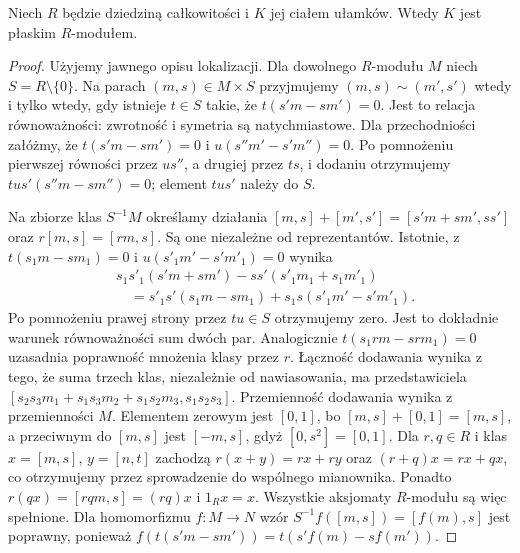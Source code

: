 \begin{twierdzenie}
\label{aa:tw:frac-flat}
Niech $R$ będzie dziedziną całkowitości i $K$
jej ciałem ułamków. Wtedy $K$ jest płaskim
$R$-modułem.
\end{twierdzenie}
\begin{proof}
Użyjemy jawnego opisu lokalizacji. Dla dowolnego
$R$-modułu $M$ niech $S=R\setminus\{0\}$.
Na parach $(m,s)\in M\times S$ przyjmujemy
$(m,s)\sim(m',s')$ wtedy i tylko wtedy, gdy
istnieje $t\in S$ takie, że $t(s'm-sm')=0$.
Jest to relacja równoważności: zwrotność i symetria
są natychmiastowe. Dla przechodniości załóżmy, że
$t(s'm-sm')=0$ i $u(s''m'-s'm'')=0$.
Po pomnożeniu pierwszej równości przez $us''$,
a drugiej przez $ts$, i dodaniu otrzymujemy
$tu s'(s''m-sm'')=0$; element $tu s'$ należy do $S$.

Na zbiorze klas $S^{-1}M$ określamy działania
$[m,s]+[m',s']=[s'm+sm',ss']$ oraz
$r[m,s]=[rm,s]$. Są one niezależne od reprezentantów.
Istotnie, z $t(s_1m-sm_1)=0$ i
$u(s'_1m'-s'm'_1)=0$ wynika
\[
\begin{aligned}
&s_1s'_1(s'm+sm')-ss'(s'_1m_1+s_1m'_1)\\
&\quad=s'_1s'(s_1m-sm_1)+s_1s(s'_1m'-s'm'_1).
\end{aligned}
\]
Po pomnożeniu prawej strony przez $tu\in S$
otrzymujemy zero. Jest to dokładnie warunek równoważności
sum dwóch par. Analogicznie $t(s_1rm-srm_1)=0$
uzasadnia poprawność mnożenia klasy przez $r$.
Łączność dodawania wynika z tego, że suma trzech
klas, niezależnie od nawiasowania, ma przedstawiciela
$[s_2s_3m_1+s_1s_3m_2+s_1s_2m_3,s_1s_2s_3]$.
Przemienność dodawania wynika z przemienności $M$.
Elementem zerowym jest $[0,1]$, bo
$[m,s]+[0,1]=[m,s]$, a przeciwnym do $[m,s]$
jest $[-m,s]$, gdyż $[0,s^2]=[0,1]$.
Dla $r,q\in R$ i klas $x=[m,s]$, $y=[n,t]$
zachodzą $r(x+y)=rx+ry$ oraz
$(r+q)x=rx+qx$, co otrzymujemy przez sprowadzenie
do wspólnego mianownika. Ponadto
$r(qx)=[rqm,s]=(rq)x$ i $1_Rx=x$.
Wszystkie aksjomaty $R$-modułu są więc spełnione.
Dla homomorfizmu $f:M\to N$ wzór
$S^{-1}f([m,s])=[f(m),s]$ jest poprawny,
ponieważ $f(t(s'm-sm'))=t(s'f(m)-sf(m'))$.


\end{proof}
